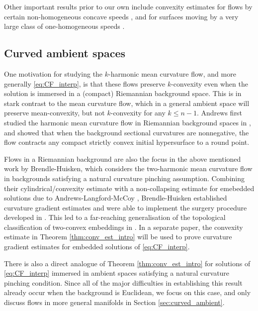 \documentclass[12pt]{amsart}
\begin{document}
Other important results prior to our own include convexity estimates for flows by certain non-homogeneous concave speeds \cite{Aless-Sin}, and for surfaces moving by a very large class of one-homogeneous speeds \cite{And-Lang-McCoy15}.

\subsection{Curved ambient spaces} One motivation for studying the $k$-harmonic mean curvature flow, and more generally \eqref{eq:CF_interp}, is that these flows preserve $k$-convexity even when the solution is immersed in a (compact) Riemannian background space. This is in stark contrast to the mean curvature flow, which in a general ambient space will preserve mean-convexity, but not $k$-convexity for any $k \leq n-1$. Andrews first studied the harmonic mean curvature flow in Riemannian background spaces in \cite{And94}, and showed that when the background sectional curvatures are nonnegative, the flow contracts any compact strictly convex initial hypersurface to a round point. 

Flows in a Riemannian background are also the focus in the above mentioned work \cite{Bren-Huisk17} by Brendle-Huisken, which considers the two-harmonic mean curvature flow in backgrounds satisfying a natural curvature pinching assumption. Combining their cylindrical/convexity estimate with a non-collapsing estimate for emebedded solutions due to Andrews-Langford-McCoy \cite{And-Lang-McCoy13}, Brendle-Huisken established curvature gradient estimates and were able to implement the surgery procedure developed in \cite{Huisk-Sin09}. This led to a far-reaching generalisation of the topological classification of two-convex embeddings in \cite{Huisk-Sin09}. In a separate paper, the convexity estimate in Theorem \ref{thm:conv_est_intro} will be used to prove curvature gradient estimates for embedded solutions of \eqref{eq:CF_interp}. 

There is also a direct analogue of Theorem \ref{thm:conv_est_intro} for solutions of \eqref{eq:CF_interp} immersed in ambient spaces satisfying a natural curvature pinching condition. Since all of the major difficulties in establishing this result already occur when the background is Euclidean, we focus on this case, and only discuss flows in more general manifolds in Section \ref{sec:curved_ambient}.
\end{document}
